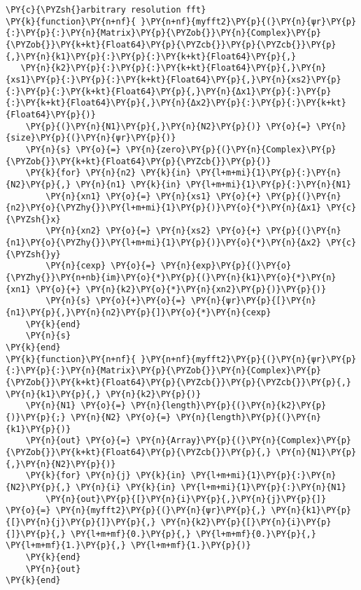 \begin{Verbatim}[commandchars=\\\{\}]
\PY{c}{\PYZsh{}arbitrary resolution fft}
\PY{k}{function}\PY{n+nf}{ }\PY{n+nf}{myfft2}\PY{p}{(}\PY{n}{ψr}\PY{p}{:}\PY{p}{:}\PY{n}{Matrix}\PY{p}{\PYZob{}}\PY{n}{Complex}\PY{p}{\PYZob{}}\PY{k+kt}{Float64}\PY{p}{\PYZcb{}}\PY{p}{\PYZcb{}}\PY{p}{,}\PY{n}{k1}\PY{p}{:}\PY{p}{:}\PY{k+kt}{Float64}\PY{p}{,}
   \PY{n}{k2}\PY{p}{:}\PY{p}{:}\PY{k+kt}{Float64}\PY{p}{,}\PY{n}{xs1}\PY{p}{:}\PY{p}{:}\PY{k+kt}{Float64}\PY{p}{,}\PY{n}{xs2}\PY{p}{:}\PY{p}{:}\PY{k+kt}{Float64}\PY{p}{,}\PY{n}{Δx1}\PY{p}{:}\PY{p}{:}\PY{k+kt}{Float64}\PY{p}{,}\PY{n}{Δx2}\PY{p}{:}\PY{p}{:}\PY{k+kt}{Float64}\PY{p}{)}
    \PY{p}{(}\PY{n}{N1}\PY{p}{,}\PY{n}{N2}\PY{p}{)} \PY{o}{=} \PY{n}{size}\PY{p}{(}\PY{n}{ψr}\PY{p}{)}
    \PY{n}{s} \PY{o}{=} \PY{n}{zero}\PY{p}{(}\PY{n}{Complex}\PY{p}{\PYZob{}}\PY{k+kt}{Float64}\PY{p}{\PYZcb{}}\PY{p}{)}
    \PY{k}{for} \PY{n}{n2} \PY{k}{in} \PY{l+m+mi}{1}\PY{p}{:}\PY{n}{N2}\PY{p}{,} \PY{n}{n1} \PY{k}{in} \PY{l+m+mi}{1}\PY{p}{:}\PY{n}{N1}
        \PY{n}{xn1} \PY{o}{=} \PY{n}{xs1} \PY{o}{+} \PY{p}{(}\PY{n}{n2}\PY{o}{\PYZhy{}}\PY{l+m+mi}{1}\PY{p}{)}\PY{o}{*}\PY{n}{Δx1} \PY{c}{\PYZsh{}x}
        \PY{n}{xn2} \PY{o}{=} \PY{n}{xs2} \PY{o}{+} \PY{p}{(}\PY{n}{n1}\PY{o}{\PYZhy{}}\PY{l+m+mi}{1}\PY{p}{)}\PY{o}{*}\PY{n}{Δx2} \PY{c}{\PYZsh{}y}
        \PY{n}{cexp} \PY{o}{=} \PY{n}{exp}\PY{p}{(}\PY{o}{\PYZhy{}}\PY{n+nb}{im}\PY{o}{*}\PY{p}{(}\PY{n}{k1}\PY{o}{*}\PY{n}{xn1} \PY{o}{+} \PY{n}{k2}\PY{o}{*}\PY{n}{xn2}\PY{p}{)}\PY{p}{)}
        \PY{n}{s} \PY{o}{+}\PY{o}{=} \PY{n}{ψr}\PY{p}{[}\PY{n}{n1}\PY{p}{,}\PY{n}{n2}\PY{p}{]}\PY{o}{*}\PY{n}{cexp}
    \PY{k}{end}
    \PY{n}{s}
\PY{k}{end}
\PY{k}{function}\PY{n+nf}{ }\PY{n+nf}{myfft2}\PY{p}{(}\PY{n}{ψr}\PY{p}{:}\PY{p}{:}\PY{n}{Matrix}\PY{p}{\PYZob{}}\PY{n}{Complex}\PY{p}{\PYZob{}}\PY{k+kt}{Float64}\PY{p}{\PYZcb{}}\PY{p}{\PYZcb{}}\PY{p}{,} \PY{n}{k1}\PY{p}{,} \PY{n}{k2}\PY{p}{)}
    \PY{n}{N1} \PY{o}{=} \PY{n}{length}\PY{p}{(}\PY{n}{k2}\PY{p}{)}\PY{p}{;} \PY{n}{N2} \PY{o}{=} \PY{n}{length}\PY{p}{(}\PY{n}{k1}\PY{p}{)}
    \PY{n}{out} \PY{o}{=} \PY{n}{Array}\PY{p}{(}\PY{n}{Complex}\PY{p}{\PYZob{}}\PY{k+kt}{Float64}\PY{p}{\PYZcb{}}\PY{p}{,} \PY{n}{N1}\PY{p}{,}\PY{n}{N2}\PY{p}{)}
    \PY{k}{for} \PY{n}{j} \PY{k}{in} \PY{l+m+mi}{1}\PY{p}{:}\PY{n}{N2}\PY{p}{,} \PY{n}{i} \PY{k}{in} \PY{l+m+mi}{1}\PY{p}{:}\PY{n}{N1}
        \PY{n}{out}\PY{p}{[}\PY{n}{i}\PY{p}{,}\PY{n}{j}\PY{p}{]} \PY{o}{=} \PY{n}{myfft2}\PY{p}{(}\PY{n}{ψr}\PY{p}{,} \PY{n}{k1}\PY{p}{[}\PY{n}{j}\PY{p}{]}\PY{p}{,} \PY{n}{k2}\PY{p}{[}\PY{n}{i}\PY{p}{]}\PY{p}{,} \PY{l+m+mf}{0.}\PY{p}{,} \PY{l+m+mf}{0.}\PY{p}{,} \PY{l+m+mf}{1.}\PY{p}{,} \PY{l+m+mf}{1.}\PY{p}{)}
    \PY{k}{end}
    \PY{n}{out}
\PY{k}{end}


\end{Verbatim}
